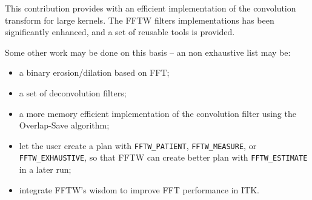 \documentclass{InsightArticle}
\begin{document}
This contribution provides with an efficient implementation of the convolution transform for large kernels.
The FFTW filters implementations has been significantly enhanced, and a set of reusable tools is provided.

Some other work may be done on this basis -- an non exhaustive list may be:
\begin{itemize}
 \item a binary erosion/dilation based on FFT;
 \item a set of deconvolution filters;
 \item a more memory efficient implementation of the convolution filter using the Overlap-Save algorithm;
 \item let the user create a plan with \verb$FFTW_PATIENT$, \verb$FFTW_MEASURE$, or
       \verb$FFTW_EXHAUSTIVE$, so that FFTW can create better plan with \verb$FFTW_ESTIMATE$ in a
       later run;
 \item integrate FFTW's wisdom to improve FFT performance in ITK.
\end{itemize}


\appendix





\nocite{ITKSoftwareGuide}
\end{document}
